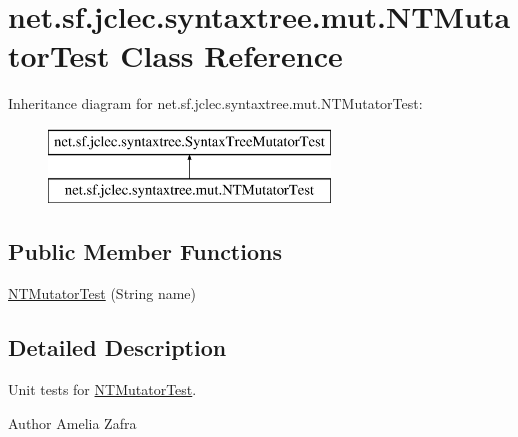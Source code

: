 \hypertarget{classnet_1_1sf_1_1jclec_1_1syntaxtree_1_1mut_1_1_n_t_mutator_test}{\section{net.\-sf.\-jclec.\-syntaxtree.\-mut.\-N\-T\-Mutator\-Test Class Reference}
\label{classnet_1_1sf_1_1jclec_1_1syntaxtree_1_1mut_1_1_n_t_mutator_test}
}
Inheritance diagram for net.\-sf.\-jclec.\-syntaxtree.\-mut.\-N\-T\-Mutator\-Test\-:\begin{figure}[H]
\begin{center}
\leavevmode
\includegraphics[height=2.000000cm]{classnet_1_1sf_1_1jclec_1_1syntaxtree_1_1mut_1_1_n_t_mutator_test}
\end{center}
\end{figure}
\subsection*{Public Member Functions}
\begin{DoxyCompactItemize}
\item 
\hyperlink{classnet_1_1sf_1_1jclec_1_1syntaxtree_1_1mut_1_1_n_t_mutator_test_a683ce45ac3875857c93d2c1c153be39a}{N\-T\-Mutator\-Test} (String name)
\end{DoxyCompactItemize}


\subsection{Detailed Description}
Unit tests for \hyperlink{classnet_1_1sf_1_1jclec_1_1syntaxtree_1_1mut_1_1_n_t_mutator_test}{N\-T\-Mutator\-Test}.

\begin{DoxyAuthor}{Author}
Amelia Zafra 
\end{DoxyAuthor}


